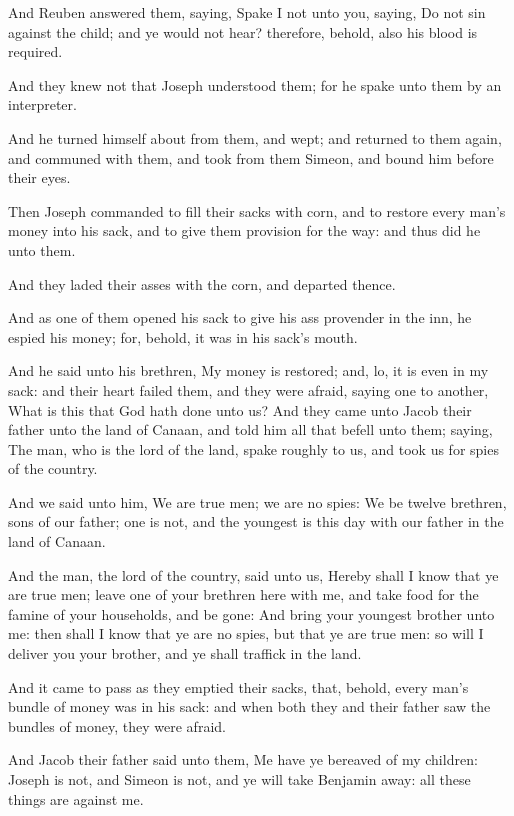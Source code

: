 \verse And Reuben answered them, saying, Spake I not unto you, saying,
Do not sin against the child; and ye would not hear? therefore,
behold, also his blood is required.

\verse And they knew not that Joseph understood them; for he spake unto
them by an interpreter.

\verse And he turned himself about from them, and wept; and returned to
them again, and communed with them, and took from them Simeon, and
bound him before their eyes.

\verse Then Joseph commanded to fill their sacks with corn, and to
restore every man's money into his sack, and to give them provision
for the way: and thus did he unto them.

\verse And they laded their asses with the corn, and departed thence.

\verse And as one of them opened his sack to give his ass provender in
the inn, he espied his money; for, behold, it was in his sack's mouth.

\verse And he said unto his brethren, My money is restored; and, lo, it
is even in my sack: and their heart failed them, and they were afraid,
saying one to another, What is this that God hath done unto us?  \verse
And they came unto Jacob their father unto the land of Canaan, and
told him all that befell unto them; saying, \verse The man, who is the
lord of the land, spake roughly to us, and took us for spies of the
country.

\verse And we said unto him, We are true men; we are no spies: \verse We
be twelve brethren, sons of our father; one is not, and the youngest
is this day with our father in the land of Canaan.

\verse And the man, the lord of the country, said unto us, Hereby shall
I know that ye are true men; leave one of your brethren here with me,
and take food for the famine of your households, and be gone: \verse
And bring your youngest brother unto me: then shall I know that ye are
no spies, but that ye are true men: so will I deliver you your
brother, and ye shall traffick in the land.

\verse And it came to pass as they emptied their sacks, that, behold,
every man's bundle of money was in his sack: and when both they and
their father saw the bundles of money, they were afraid.

\verse And Jacob their father said unto them, Me have ye bereaved of my
children: Joseph is not, and Simeon is not, and ye will take Benjamin
away: all these things are against me.

